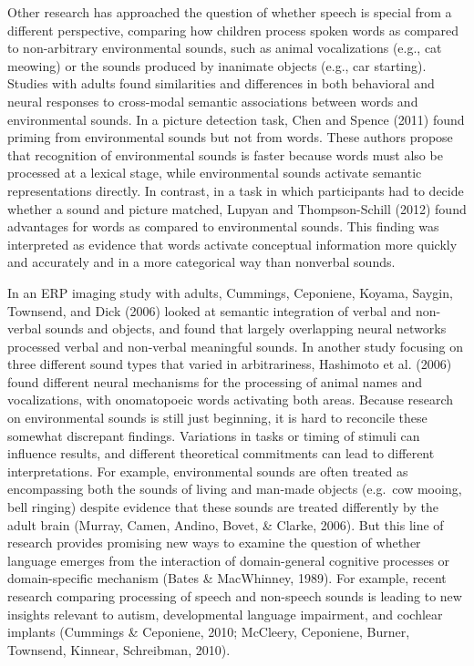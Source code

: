 \documentclass[english,floatsintext,man]{apa6}
\newcounter{author}
\theoremstyle{definition}
\theoremstyle{definition}
\theoremstyle{definition}
\theoremstyle{remark}
\begin{document}
Other research has approached the question of whether speech is special
from a different perspective, comparing how children process spoken
words as compared to non-arbitrary environmental sounds, such as animal
vocalizations (e.g., cat meowing) or the sounds produced by inanimate
objects (e.g., car starting). Studies with adults found similarities and
differences in both behavioral and neural responses to cross-modal
semantic associations between words and environmental sounds. In a
picture detection task, Chen and Spence (2011) found priming from
environmental sounds but not from words. These authors propose that
recognition of environmental sounds is faster because words must also be
processed at a lexical stage, while environmental sounds activate
semantic representations directly. In contrast, in a task in which
participants had to decide whether a sound and picture matched, Lupyan
and Thompson-Schill (2012) found advantages for words as compared to
environmental sounds. This finding was interpreted as evidence that
words activate conceptual information more quickly and accurately and in
a more categorical way than nonverbal sounds.

In an ERP imaging study with adults, Cummings, Ceponiene, Koyama,
Saygin, Townsend, and Dick (2006) looked at semantic integration of
verbal and non-verbal sounds and objects, and found that largely
overlapping neural networks processed verbal and non-verbal meaningful
sounds. In another study focusing on three different sound types that
varied in arbitrariness, Hashimoto et al. (2006) found different neural
mechanisms for the processing of animal names and vocalizations, with
onomatopoeic words activating both areas. Because research on
environmental sounds is still just beginning, it is hard to reconcile
these somewhat discrepant findings. Variations in tasks or timing of
stimuli can influence results, and different theoretical commitments can
lead to different interpretations. For example, environmental sounds are
often treated as encompassing both the sounds of living and man-made
objects (e.g.~cow mooing, bell ringing) despite evidence that these
sounds are treated differently by the adult brain (Murray, Camen,
Andino, Bovet, \& Clarke, 2006). But this line of research provides
promising new ways to examine the question of whether language emerges
from the interaction of domain-general cognitive processes or
domain-specific mechanism (Bates \& MacWhinney, 1989). For example,
recent research comparing processing of speech and non-speech sounds is
leading to new insights relevant to autism, developmental language
impairment, and cochlear implants (Cummings \& Ceponiene, 2010;
McCleery, Ceponiene, Burner, Townsend, Kinnear, Schreibman, 2010).
\end{document}
